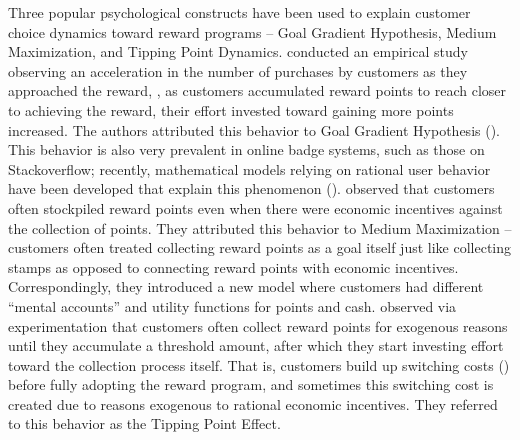 Three popular psychological constructs have been used to explain customer choice dynamics toward reward programs -- Goal Gradient Hypothesis, Medium Maximization, and Tipping Point Dynamics.
\cite{kivetz2006goal} conducted an empirical study observing an acceleration in the number of purchases by customers as they approached the reward, \ie, as customers accumulated reward points to reach closer to achieving the reward, their effort invested toward gaining more points increased. 
The authors attributed this behavior to Goal Gradient Hypothesis (\cite{hull1932goal}). 
This behavior is also very prevalent in online badge systems, such as those on Stackoverflow; recently, mathematical models relying on rational user behavior have been developed that explain this phenomenon (\cite{leskovec2013steering}).
\cite{stourm2015stockpiling, dreze2004using} observed that customers often stockpiled reward points even when there were economic incentives against the collection of points. They attributed this behavior to Medium Maximization -- customers often treated collecting reward points as a goal itself just like collecting stamps as opposed to connecting reward points with economic incentives.
Correspondingly, they introduced a new model where customers had different ``mental accounts'' and utility functions for points and cash.
\cite{gao2014influence} observed via experimentation that customers often collect reward points for exogenous reasons until they accumulate a threshold amount, after which they start investing effort toward the collection process itself.
That is, customers build up switching costs (\cite{klemperer1995competition}) before fully adopting the reward program, and sometimes this switching cost is created due to reasons exogenous to rational economic incentives.
They referred to this behavior as the Tipping Point Effect.


